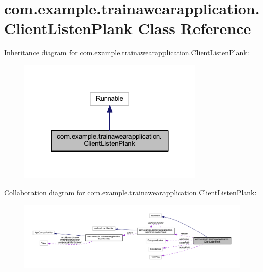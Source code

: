 \hypertarget{classcom_1_1example_1_1trainawearapplication_1_1_client_listen_plank}{}\section{com.\+example.\+trainawearapplication.\+Client\+Listen\+Plank Class Reference}
\label{classcom_1_1example_1_1trainawearapplication_1_1_client_listen_plank}


Inheritance diagram for com.\+example.\+trainawearapplication.\+Client\+Listen\+Plank\+:
\nopagebreak
\begin{figure}[H]
\begin{center}
\leavevmode
\includegraphics[width=252pt]{classcom_1_1example_1_1trainawearapplication_1_1_client_listen_plank__inherit__graph}
\end{center}
\end{figure}


Collaboration diagram for com.\+example.\+trainawearapplication.\+Client\+Listen\+Plank\+:
\nopagebreak
\begin{figure}[H]
\begin{center}
\leavevmode
\includegraphics[width=350pt]{classcom_1_1example_1_1trainawearapplication_1_1_client_listen_plank__coll__graph}
\end{center}
\end{figure}
